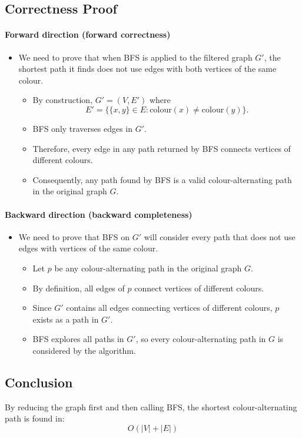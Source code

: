 \documentclass[12pt]{article}
\begin{document}
\subsection*{Correctness Proof}
\paragraph{Forward direction (forward correctness)}  
\begin{itemize}

\item We need to prove that when BFS is applied to the filtered graph \(G'\), the shortest path it finds does not use edges with both vertices of the same colour.

\begin{itemize}
\item By construction, \(G' = (V,E')\) where 
\[
E' = \{\{x,y\}\in E : \mathrm{colour}(x) \neq \mathrm{colour}(y)\}.
\]
\item BFS only traverses edges in \(G'\).  
\item Therefore, every edge in any path returned by BFS connects vertices of different colours.  
\item Consequently, any path found by BFS is a valid colour-alternating path in the original graph \(G\).
\end{itemize}

\end{itemize}
\paragraph{Backward direction (backward completeness)} 
\begin{itemize}
    \item We need to prove that BFS on \(G'\) will consider every path that does not use edges with vertices of the same colour.

\begin{itemize}
\item Let \(p\) be any colour-alternating path in the original graph \(G\).  
\item By definition, all edges of \(p\) connect vertices of different colours.  
\item Since \(G'\) contains all edges connecting vertices of different colours, \(p\) exists as a path in \(G'\).  
\item BFS explores all paths in \(G'\), so every colour-alternating path in \(G\) is considered by the algorithm.
\end{itemize}
\end{itemize} 

\subsection*{Conclusion}
By reducing the graph first and then calling BFS, the shortest colour-alternating path is found in:
\[
\boxed{O(|V| + |E|)}
\]
\end{document}
